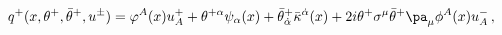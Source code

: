 \begin{equation}\label{qplus}
  q^+(x,\theta^+,\bar\theta^+,u^\pm) =  
\varphi^A(x)u^+_A + \theta^{+\alpha}\psi_\alpha(x) + \bar\theta^+_{\dot\alpha} \bar\kappa^{\dot\alpha}(x)+ 2i \theta^+\sigma^\mu\bar\theta^+ \pa_\mu \phi^A(x)u^-_A \,,
\end{equation}

